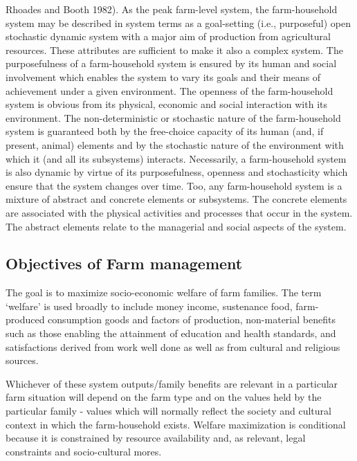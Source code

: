 \documentclass[11pt,]{book}
\theoremstyle{definition}
\theoremstyle{definition}
\theoremstyle{definition}
\theoremstyle{remark}
\begin{document}
\begin{itemize}
  Rhoades and Booth 1982). As the peak farm-level system, the
  farm-household system may be described in system terms as a
  goal-setting (i.e., purposeful) open stochastic dynamic system with a
  major aim of production from agricultural resources. These attributes
  are sufficient to make it also a complex system. The purposefulness of
  a farm-household system is ensured by its human and social involvement
  which enables the system to vary its goals and their means of
  achievement under a given environment. The openness of the
  farm-household system is obvious from its physical, economic and
  social interaction with its environment. The non-deterministic or
  stochastic nature of the farm-household system is guaranteed both by
  the free-choice capacity of its human (and, if present, animal)
  elements and by the stochastic nature of the environment with which it
  (and all its subsystems) interacts. Necessarily, a farm-household
  system is also dynamic by virtue of its purposefulness, openness and
  stochasticity which ensure that the system changes over time. Too, any
  farm-household system is a mixture of abstract and concrete elements
  or subsystems. The concrete elements are associated with the physical
  activities and processes that occur in the system. The abstract
  elements relate to the managerial and social aspects of the system.
\end{itemize}

\subsection{Objectives of Farm
management}\label{objectives-of-farm-management}

The goal is to maximize socio-economic welfare of farm families. The
term `welfare' is used broadly to include money income, sustenance food,
farm-produced consumption goods and factors of production, non-material
benefits such as those enabling the attainment of education and health
standards, and satisfactions derived from work well done as well as from
cultural and religious sources.

Whichever of these system outputs/family benefits are relevant in a
particular farm situation will depend on the farm type and on the values
held by the particular family - values which will normally reflect the
society and cultural context in which the farm-household exists. Welfare
maximization is conditional because it is constrained by resource
availability and, as relevant, legal constraints and socio-cultural
mores.
\end{document}
